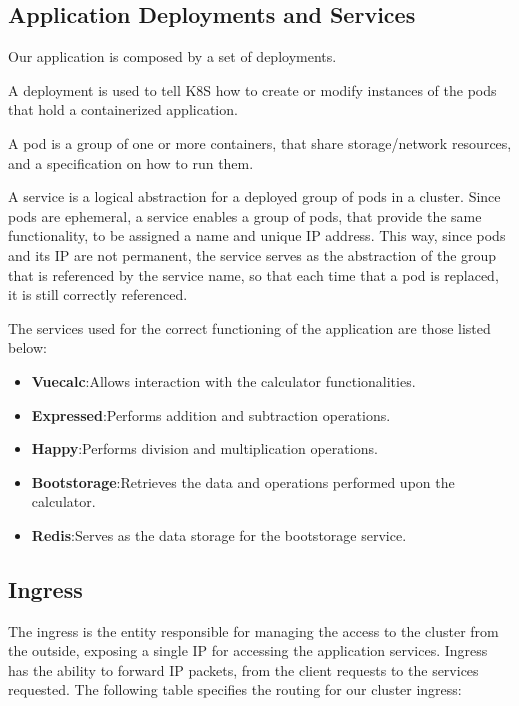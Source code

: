 \documentclass[12pt,a4paper,oneside]{report}
\begin{document}
\subsection{Application Deployments and Services}

Our application is composed by a set of deployments. 

A deployment is used to tell \ac{K8S} how to create or modify instances of the pods that hold a containerized application.

A pod is a group of one or more containers, that share storage/network resources, and a specification on how to run them.

A service is a logical abstraction for a deployed group of pods in a cluster. Since pods are ephemeral, a service enables a group of pods, that provide the same functionality, to be assigned a name and unique IP address. This way, since pods and its \ac{IP} are not permanent, the service serves as the abstraction of the group that is referenced by the service name, so that each time that a pod is replaced, it is still correctly referenced.

\par
The services used for the correct functioning of the application are those listed below:
\begin{itemize}
    \item \textbf{Vuecalc}:Allows interaction with the calculator functionalities.
    \item \textbf{Expressed}:Performs addition and subtraction operations.
    \item \textbf{Happy}:Performs division and multiplication operations.
    \item \textbf{Bootstorage}:Retrieves the data and operations performed upon the calculator.
    \item \textbf{Redis}:Serves as the data storage for the bootstorage service.
\end{itemize}



\subsection{Ingress}

The ingress is the entity responsible for managing the access to the cluster from the outside, exposing a single \ac{IP} for accessing the application services. Ingress has the ability to forward IP packets, from the client requests to the services requested. The following table specifies the routing for our cluster ingress:
\end{document}
